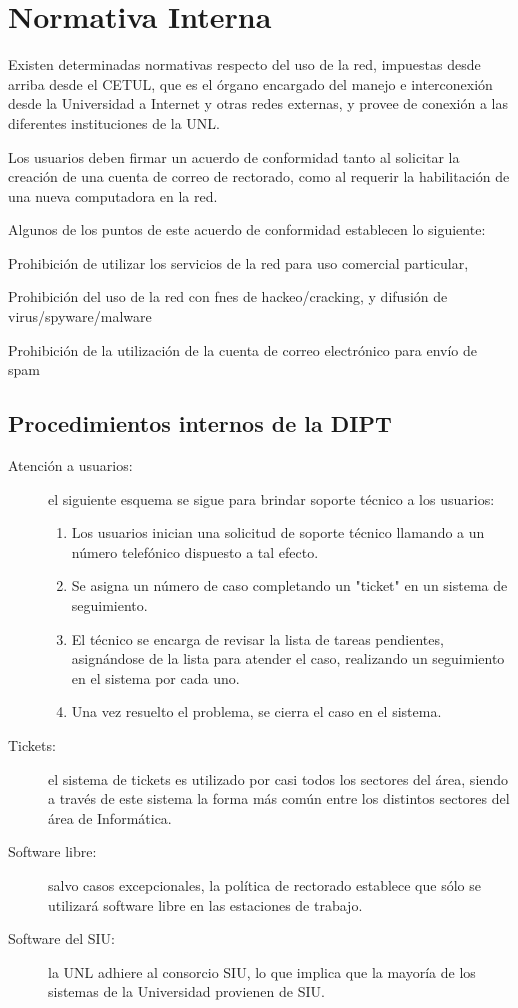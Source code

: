 \documentclass[a4paper,11pt,oneside]{article}
\begin{document}
\section{Normativa Interna}
%
Existen determinadas normativas respecto del uso de la red, impuestas
desde arriba desde el CETUL, que es el órgano encargado del manejo e
interconexión desde la Universidad a Internet y otras redes externas,
y provee de conexión a las diferentes instituciones de la UNL.

Los usuarios deben firmar un acuerdo de conformidad tanto al solicitar
la creación de una cuenta de correo de rectorado, como al requerir la
habilitación de una nueva computadora en la red.

Algunos de los puntos de este acuerdo de conformidad establecen lo
siguiente:
%
\begin{itemize*}
\item Prohibición de utilizar los servicios de la red para uso
  comercial particular,
\item Prohibición del uso de la red con fnes de hackeo/cracking, y
  difusión de virus/spyware/malware
\item Prohibición de la utilización de la cuenta de correo electrónico
  para envío de spam
\end{itemize*}
%
\subsection*{Procedimientos internos de la DIPT}
%
\begin{description}
\item[Atención a usuarios:] el siguiente esquema se sigue para brindar
  soporte técnico a los usuarios:
  \begin{enumerate}
  \item Los usuarios inician una solicitud de soporte técnico llamando
    a un número telefónico dispuesto a tal efecto.
  \item Se asigna un número de caso completando un "ticket" en un
    sistema de seguimiento.
  \item El técnico se encarga de revisar la lista de tareas
    pendientes, asignándose de la lista para atender el caso,
    realizando un seguimiento en el sistema por cada uno.
  \item Una vez resuelto el problema, se cierra el caso en el sistema.
  \end{enumerate}
\item[Tickets:] el sistema de tickets es utilizado por casi todos los
  sectores del área, siendo a través de este sistema la forma más
  común entre los distintos sectores del área de Informática.
\item[Software libre:] salvo casos excepcionales, la política de
  rectorado establece que sólo se utilizará software libre en las
  estaciones de trabajo.
\item[Software del SIU:] la UNL adhiere al consorcio SIU, lo que
  implica que la mayoría de los sistemas de la Universidad provienen
  de SIU.
\end{description}
%
\end{document}
